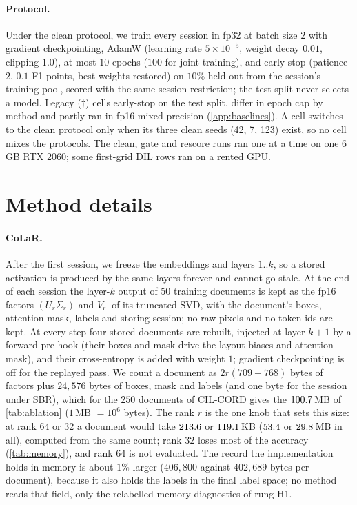 \paragraph{Protocol.} Under the clean protocol, we train every session in fp32 at batch size $2$ with gradient checkpointing, AdamW (learning rate $5{\times}10^{-5}$, weight decay $0.01$, clipping $1.0$), at most $10$ epochs ($100$ for joint training), and early-stop (patience $2$, $0.1$ F1 points, best weights restored) on $10\%$ held out from the session's training pool, scored with the same session restriction; the test split never selects a model. Legacy ($\dagger$) cells early-stop on the test split, differ in epoch cap by method and partly ran in fp16 mixed precision (\cref{app:baselines}). A cell switches to the clean protocol only when its three clean seeds (42, 7, 123) exist, so no cell mixes the protocols. The clean, gate and rescore runs ran one at a time on one $6$\,GB RTX 2060; some first-grid DIL rows ran on a rented GPU.

\section{Method details}
\label{app:method}

\paragraph{CoLaR.} After the first session, we freeze the embeddings and layers $1..k$, so a stored activation is produced by the same layers forever and cannot go stale. At the end of each session the layer-$k$ output of $50$ training documents is kept as the fp16 factors $(U_r\Sigma_r)$ and $V_r^{\top}$ of its truncated SVD, with the document's boxes, attention mask, labels and storing session; no raw pixels and no token ids are kept. At every step four stored documents are rebuilt, injected at layer $k{+}1$ by a forward pre-hook (their boxes and mask drive the layout biases and attention mask), and their cross-entropy is added with weight $1$; gradient checkpointing is off for the replayed pass. We count a document as $2r(709{+}768)$ bytes of factors plus $24{,}576$ bytes of boxes, mask and labels (and one byte for the session under SBR), which for the $250$ documents of CIL-CORD gives the $100.7$\,MB of \cref{tab:ablation} ($1$\,MB $=10^6$ bytes). The rank $r$ is the one knob that sets this size: at rank $64$ or $32$ a document would take $213.6$ or $119.1$\,KB ($53.4$ or $29.8$\,MB in all), computed from the same count; rank $32$ loses most of the accuracy (\cref{tab:memory}), and rank $64$ is not evaluated. The record the implementation holds in memory is about $1\%$ larger ($406{,}800$ against $402{,}689$ bytes per document), because it also holds the labels in the final label space; no method reads that field, only the relabelled-memory diagnostics of rung H1.

